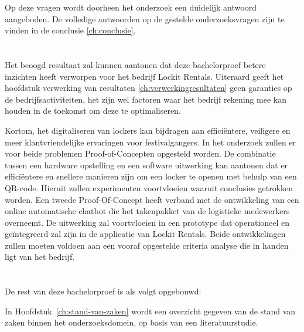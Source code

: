 Op deze vragen wordt doorheen het onderzoek een duidelijk antwoord aangeboden. De volledige antwoorden op de gestelde onderzoeksvragen zijn te vinden in de conclusie \ref{ch:conclusie}.


\section{}%
\label{sec:onderzoeksdoelstelling}
Het beoogd resultaat zal kunnen aantonen dat deze bachelorproef betere inzichten heeft verworpen voor het bedrijf Lockit Rentals. Uiteraard geeft het hoofdstuk verwerking van resultaten \ref{ch:verwerkingresultaten} geen garanties op de bedrijfsactiviteiten, het zijn wel factoren waar het bedrijf rekening mee kan houden in de toekomst om deze te optimaliseren.

Kortom, het digitaliseren van lockers kan bijdragen aan efficiëntere, veiligere en meer klantvriendelijke ervaringen voor festivalgangers. In het onderzoek zullen er voor beide problemen Proof-of-Concepten opgesteld worden. De combinatie tussen een hardware opstelling en een software uitwerking kan aantonen dat er efficiëntere en snellere manieren zijn om een locker te openen met behulp van een QR-code. Hieruit zullen experimenten voortvloeien waaruit conclusies getrokken worden. Een tweede Proof-Of-Concept heeft verband met de ontwikkeling van een online automatische chatbot die het takenpakket van de logistieke medewerkers overneemt. De uitwerking zal voortvloeien in een prototype dat operationeel en geïntegreerd zal zijn in de applicatie van Lockit Rentals. Beide ontwikkelingen zullen moeten voldoen aan een vooraf opgestelde criteria analyse die in handen ligt van het bedrijf. 


\section{}%
\label{sec:opzet-bachelorproef}

De rest van deze bachelorproef is als volgt opgebouwd:

In Hoofdstuk~\ref{ch:stand-van-zaken} wordt een overzicht gegeven van de stand van zaken binnen het onderzoeksdomein, op basis van een literatuurstudie.

